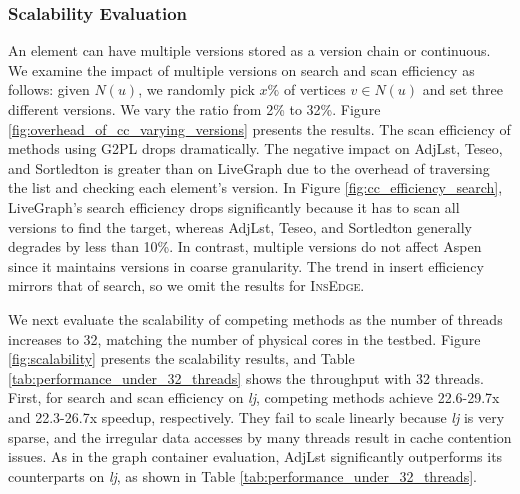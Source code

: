 \subsubsection{Scalability Evaluation} \label{sec:scalability_evaluation}

An element can have multiple versions stored as a version chain or continuous. We examine the impact of multiple versions on search and scan efficiency as follows: given $N(u)$, we randomly pick $x\%$ of vertices $v\in N(u)$ and set three different versions. We vary the ratio from 2\% to 32\%. Figure \ref{fig:overhead_of_cc_varying_versions} presents the results. The scan efficiency of methods using G2PL drops dramatically. The negative impact on AdjLst, Teseo, and Sortledton is greater than on LiveGraph due to the overhead of traversing the list and checking each element’s version. In Figure \ref{fig:cc_efficiency_search}, LiveGraph’s search efficiency drops significantly because it has to scan all versions to find the target, whereas AdjLst, Teseo, and Sortledton generally degrades by less than 10\%. In contrast, multiple versions do not affect Aspen since it maintains versions in coarse granularity. The trend in insert efficiency mirrors that of search, so we omit the results for \textsc{InsEdge}.


We next evaluate the scalability of competing methods as the number of threads increases to 32, matching the number of physical cores in the testbed. Figure \ref{fig:scalability} presents the scalability results, and Table \ref{tab:performance_under_32_threads} shows the throughput with 32 threads. First, for search and scan efficiency on \emph{lj}, competing methods achieve 22.6-29.7x and 22.3-26.7x speedup, respectively. They fail to scale linearly because \emph{lj} is very sparse, and the irregular data accesses by many threads result in cache contention issues. As in the graph container evaluation, AdjLst significantly outperforms its counterparts on \emph{lj}, as shown in Table \ref{tab:performance_under_32_threads}.

